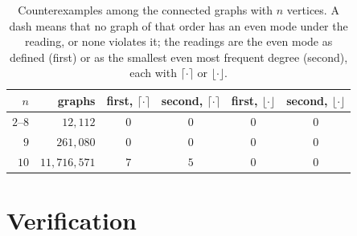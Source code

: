 \documentclass[11pt]{amsart}
\theoremstyle{definition}
\theoremstyle{remark}
\numberwithin{equation}{section}
\begin{document}
\begin{table}[t]
\centering
\caption{Counterexamples among the connected graphs with $n$ vertices. A dash means that no graph of that order has an even mode under the reading, or none violates it; the readings are the even mode as defined (first) or as the smallest even most frequent degree (second), each with $\lceil\cdot\rceil$ or $\lfloor\cdot\rfloor$.}
\label{tab:search}
\begin{tabular}{rrcccc}
\toprule
$n$ & graphs & first, $\lceil\cdot\rceil$ & second, $\lceil\cdot\rceil$ & first, $\lfloor\cdot\rfloor$ & second, $\lfloor\cdot\rfloor$\\
\midrule
$2$--$8$ & $12{,}112$ & $0$ & $0$ & $0$ & $0$\\
$9$ & $261{,}080$ & $0$ & $0$ & $0$ & $0$\\
$10$ & $11{,}716{,}571$ & $7$ & $5$ & $0$ & $0$\\
\bottomrule
\end{tabular}
\end{table}

\appendix

\section{Verification}\label{app:verification}
\end{document}
